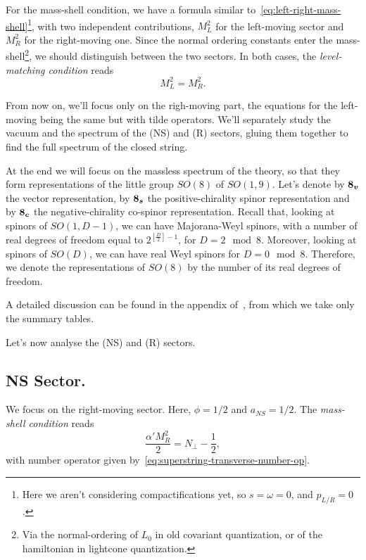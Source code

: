 For the mass-shell condition, we have a formula similar to~\eqref{eq:left-right-mass-shell}\footnote{Here we aren't considering compactifications yet, so $s = \omega = 0$, and $p_{L/R} = 0$.}, with two independent contributions, $M^2_L$ for the left-moving sector and $M^2_R$ for the right-moving one. Since the normal ordering constants enter the mass-shell\footnote{Via the normal-ordering of $L_0$ in old covariant quantization, or of the hamiltonian in lightcone quantization.}, we should distinguish between the two sectors. In both cases, the \emph{level-matching condition} reads
\begin{equation}\label{eq:superstring-level-matching}
    M^2_L = M^2_R.
\end{equation}

From now on, we'll focus only on the righ-moving part, the equations for the left-moving being the same but with tilde operators. We'll separately study the vacuum and the spectrum of the (NS) and (R) sectors, gluing them together to find the full spectrum of the closed string.

At the end we will focus on the massless spectrum of the theory, so that they form representations of the little group $SO(8)$ of $SO(1,9)$. Let's denote by $\boldsymbol{8_v}$ the vector representation, by $\boldsymbol{8_s}$ the positive-chirality spinor representation and by $\boldsymbol{8_c}$ the negative-chirality co-spinor representation. Recall that, looking at spinors of $SO(1,D-1)$, we can have Majorana-Weyl spinors, with a number of real degrees of freedom equal to $2^{[\frac{D}{2}]-1}$, for $D = 2 \mod 8$. Moreover, looking at spinors of $SO(D)$, we can have real Weyl spinors for $D = 0 \mod 8$. Therefore, we denote the representations of $SO(8)$ by the number of its real degrees of freedom.

A detailed discussion can be found in the appendix of~\cite{polchisnki:superstrings}, from which we take only the summary tables.
\begin{equation}
    
\end{equation}
\begin{equation}
    
\end{equation}

Let's now analyse the (NS) and (R) sectors.

\subsection{NS Sector.}
We focus on the right-moving sector. Here, $\phi = 1/2$ and $a_{NS} = 1/2$. The \emph{mass-shell condition} reads
\begin{equation}\label{eq:NS-mass-shell}
    \frac{\alpha' M^2_R}{2} = {N}_\perp - \frac{1}{2},
\end{equation}
with number operator given by~\eqref{eq:superstring-transverse-number-op}.

